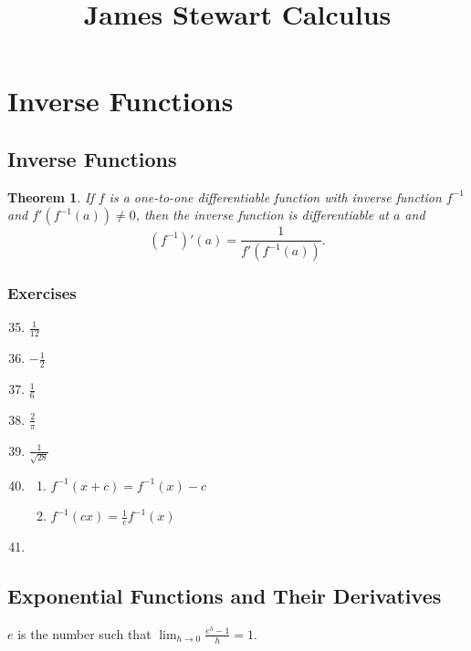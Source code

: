 \documentclass{article} \usepackage[margin=1in]{geometry}
\title{James Stewart Calculus} \author{} \date{}
\newtheorem*{theorem*}{Theorem}
\begin{document}
\maketitle
\setcounter{section}{5}
\section{Inverse Functions}
\subsection{Inverse Functions}
\begin{theorem*}
	If $f$ is a one-to-one differentiable function with inverse function $f^{-1}$ and $f'(f^{-1}(a))\ne0$,
	then the inverse function is differentiable at $a$ and
	\[(f^{-1})'(a)=\frac{1}{f'(f^{-1}(a))}.\]
\end{theorem*}
\subsubsection*{Exercises}
\begin{enumerate}
	\setcounter{enumi}{34}
	\item $\frac{1}{12}$
	      \setcounter{enumi}{36}
	\item $-\frac{1}{2}$
	      \setcounter{enumi}{38}
	\item $\frac{1}{6}$
	      \setcounter{enumi}{40}
	\item $\frac{2}{\pi}$
	      \setcounter{enumi}{44}
	\item $\frac{1}{\sqrt{28}}$
	      \setcounter{enumi}{48}
	\item \begin{enumerate}
		      \item $f^{-1}(x+c)=f^{-1}(x)-c$
		      \item $f^{-1}(cx)=\frac{1}{c}f^{-1}(x)$
	      \end{enumerate}
	\item
\end{enumerate}

\subsection{Exponential Functions and Their Derivatives}
\begin{definition*}
	$e$ is the number such that $\lim_{h\to0}\frac{e^h-1}{h}=1$.
\end{definition*}
\end{document}

